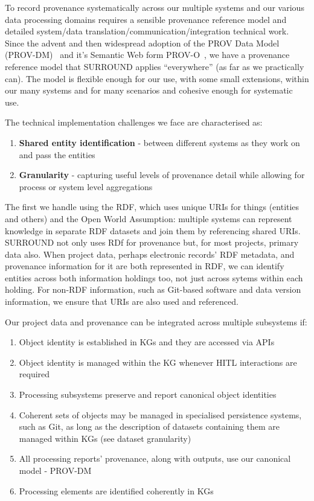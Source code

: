 \documentclass[letterpaper,twocolumn,10pt]{article}
\begin{document}
To record provenance systematically across our multiple systems and our various data processing domains requires a sensible provenance
reference model and detailed system/data translation/communication/integration technical work. Since the advent and then widespread 
adoption of the PROV Data Model (PROV-DM)~\cite{moreau_prov-dm_2013} and it's Semantic Web form PROV-O~\cite{lebo_prov-o:_2013}, we 
have a provenance reference model that SURROUND applies ``everywhere'' (as far as we practically can). The model is flexible enough
for our use, with some small extensions, within our many systems and for many scenarios and cohesive enough for systematic use.

The technical implementation challenges we face are characterised as:

\begin{enumerate}
  \item \textbf{Shared entity identification} - between different systems as they work on and pass the entities
  \item \textbf{Granularity} - capturing useful levels of provenance detail while allowing for process or system level aggregations
\end{enumerate}

The first we handle using the RDF, which uses unique URIs for things (entities and others) and 
the Open World Assumption: multiple systems can represent knowledge in separate RDF datasets and join them by referencing 
shared URIs. SURROUND not only uses RDf for provenance but, for most projects, primary data also. When 
project data, perhaps electronic records' RDF metadata, and provenance information for it
are both represented in RDF, we can identify entities across both information holdings too, not just across sytems within 
each holding. For non-RDF information, such as Git-based software and data version information, we ensure that URIs are also used and referenced.

Our project data and provenance can be integrated across multiple subsystems if:

\begin{enumerate}
  \item Object identity is established in KGs and they are accessed via APIs
  \item Object identity is managed within the KG whenever HITL interactions are required
  \item Processing subsystems preserve and report canonical object identities
  \item Coherent sets of objects may be managed in specialised persistence systems, such as Git, as long as the description of datasets containing them are managed within KGs (see dataset granularity)
  \item All processing reports' provenance, along with outputs, use our canonical model - PROV-DM
  \item Processing elements are identified coherently in KGs
\end{enumerate}
\end{document}
